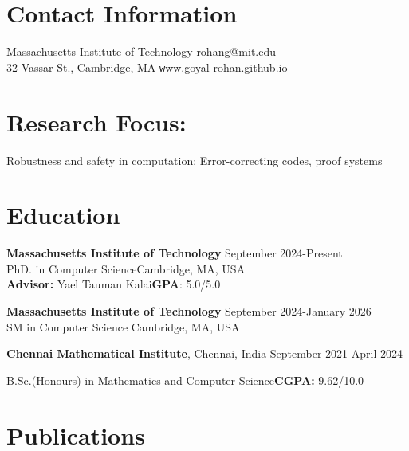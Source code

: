 \documentclass[margin,line, 10pt]{res}
\begin{document}

\begin{resume}
\section{\sc Contact Information}
Massachusetts Institute of Technology \hfill {rohan\textunderscore g@mit.edu}\\
32 Vassar St., Cambridge, MA \hfill \href{https://goyal-rohan.github.io/}{\texttt www.goyal-rohan.github.io}

\section{\sc Research Focus:}
Robustness and safety in computation: {\small Error-correcting codes, proof systems}
\section{\sc Education}


{\bf Massachusetts Institute of Technology} \hfill September 2024-Present\\
PhD. in Computer Science\hfill Cambridge, MA, USA\\
{\bf Advisor:} Yael Tauman Kalai\hfill {\bf GPA}: 5.0/5.0

{\bf Massachusetts Institute of Technology} \hfill September 2024-January 2026 \\
SM in Computer Science \hfill Cambridge, MA, USA

{\bf Chennai Mathematical Institute}, Chennai, India \hfill September 2021-April 2024

\vspace{-0.4cm}
B.Sc.(Honours) in Mathematics and Computer Science{\hfill{\bf CGPA:} 9.62/10.0}




\section{\sc Publications}




\end{resume}
\end{document}

